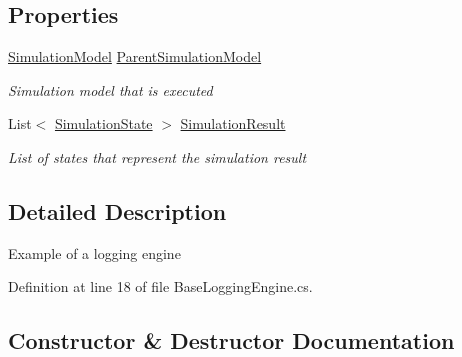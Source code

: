 \subsection*{Properties}
\begin{DoxyCompactItemize}
\item 
\hyperlink{class_simulation_core_1_1_simulation_classes_1_1_simulation_model}{Simulation\+Model} \hyperlink{class_sample_hospital_model_1_1_model_log_1_1_base_logging_engine_a95e2cd4ff74846cccfdd755fd87b0c3d}{Parent\+Simulation\+Model}
\begin{DoxyCompactList}\small\item\em Simulation model that is executed \end{DoxyCompactList}\item 
List$<$ \hyperlink{class_sample_hospital_model_1_1_model_log_1_1_simulation_state}{Simulation\+State} $>$ \hyperlink{class_sample_hospital_model_1_1_model_log_1_1_base_logging_engine_ad9b6b545975b8e9ac4d223b30971b0f1}{Simulation\+Result}
\begin{DoxyCompactList}\small\item\em List of states that represent the simulation result \end{DoxyCompactList}\end{DoxyCompactItemize}


\subsection{Detailed Description}
Example of a logging engine 



Definition at line 18 of file Base\+Logging\+Engine.\+cs.



\subsection{Constructor \& Destructor Documentation}

